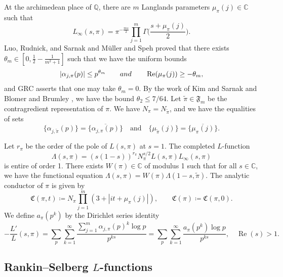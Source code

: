 \documentclass[12pt,reqno]{amsart}
\theoremstyle{remark}
\DeclareMathOperator{\Real}{Re}
\numberwithin{equation}{section}
\begin{document}
    At the archimedean place of $\mathbb{Q}$, there are $m$ Langlands parameters $\mu_{\pi}(j)\in\mathbb{C}$ such that
    \[
        L_{\infty}(s,\pi) = \pi^{-\frac{ms}{2}}\prod_{j=1}^{m}\Gamma\Big(\frac{s+\mu_{\pi}(j)}{2}\Big).
    \]
    Luo, Rudnick, and Sarnak \cite{LRS} and M\"uller  and Speh \cite{MS} proved that there exists $\theta_m\in[0,\frac{1}{2}-\frac{1}{m^2+1}]$ such that we have the uniform bounds
    \begin{equation}
	\label{eqn:LRS_finite}
            |\alpha_{j,\pi}(p)|\leq  p^{\theta_m}\qquad\textup{ and }\qquad \Real(\mu_{\pi}(j)) \geq -\theta_m,
    \end{equation}
    and GRC asserts that one may take $\theta_m=0$. By the work of Kim and Sarnak \cite[Appendix 2]{Kim} and Blomer and Brumley \cite{BB}, we have the bound $\theta_2 \le 7/64$. Let $\widetilde{\pi}\in\mathfrak{F}_m$ be the contragredient representation of $\pi$. We have $N_{\pi}=N_{\widetilde{\pi}}$, and we have the equalities of sets
    \[
    \{\alpha_{j,\widetilde{\pi}}(p)\}=\{\overline{ \alpha_{j,\pi}(p)}\} \quad \text{and} \quad \{\mu_{\widetilde{\pi}}( j)\}=\{\overline{\mu_{\pi}(j)}\}.
    \]
	
    Let $r_{\pi}$ be the order of the pole of $L(s,\pi)$ at $s=1$.  The completed $L$-function
    \[
        \Lambda(s,\pi) = (s(1-s))^{r_{\pi}}N_{\pi}^{s/2}L(s,\pi)L_{\infty}(s,\pi)
    \]
    is entire of order 1. There exists $W(\pi) \in \mathbb{C}$ of modulus 1 such that for all $s\in\mathbb{C}$, we have the functional equation $\Lambda(s,\pi)=W(\pi)\Lambda(1-s,\widetilde{\pi})$. The analytic conductor of $\pi$ \cite{IS} is given by
    \begin{equation}
	\label{eqn:analytic_conductor_def}
            \mathfrak{C}(\pi,t)\coloneqq N_{\pi}\prod_{j=1}^m (3+|it+\mu_{\pi}(j)|),\qquad \mathfrak{C}(\pi)\coloneqq \mathfrak{C}(\pi,0).
    \end{equation}
    We define $a_{\pi}(p^k)$ by the Dirichlet series identity
    \[
    -\frac{L'}{L}(s, \pi) = \sum_{p}\sum_{k=1}^{\infty} \frac{\sum_{j=1}^m \alpha_{j,\pi}(p)^k\log p}{p^{ks}} = \sum_{p}\sum_{k=1}^{\infty} \frac{a_{\pi}(p^k)\log p}{p^{ks}},  \quad \Real(s) > 1. 
    \]



    \subsection{Rankin--Selberg \texorpdfstring{$L$}{L}-functions}
    \label{subsec:RS}
\end{document}
